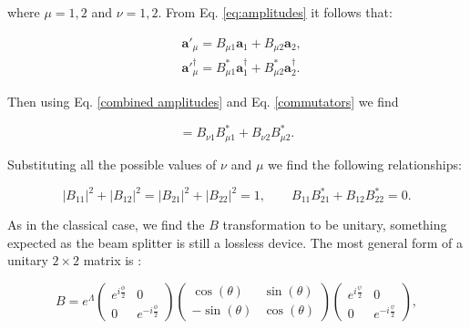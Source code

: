 \documentclass[12pt]{book}
\begin{document}
where $\mu=1,2$ and $\nu=1,2$. From Eq. \ref{eq:amplitudes} it follows that:

\begin{align}
&\mathbf{a}'_{\mu}=B_{\mu 1}\mathbf{a}_{1}+B_{\mu 2} \mathbf{a}_{2}, \\
&\mathbf{a}'^{\dagger}_{\mu}=B_{\mu 1}^{*}\mathbf{a}^{\dagger}_{1}+B_{\mu 2}^{*} \mathbf{a}^{\dagger}_{2}.
\label{combined amplitudes}
\end{align}

Then using Eq. \ref{combined amplitudes} and Eq. \ref{commutators} we find 

\begin{equation}
   [\mathbf{a}'_{\nu},\mathbf{a}'^{\dagger}_{\mu}]=B_{\nu 1} B_{\mu 1}^{*}+B_{\nu 2} B_{\mu 2}^{*} .
\end{equation}

Substituting all the possible values of $\nu$ and $\mu$ we find the following relationships:

\begin{equation}
|B_{11}|^{2}+|B_{12}|^{2}=|B_{21}|^{2}+|B_{22}|^{2}=1 ,\qquad B_{11} B_{21}^{*}+B_{12} B_{22}^{*}=0.
\end{equation}

As in the classical case, we find the $B$ transformation to be unitary, something expected as the beam splitter is still a lossless device. The most general form of a unitary $2\times2$ matrix is \cite{leonhardt}:


\begin{equation}
B=e^{\Lambda} \begin{pmatrix} e^{i\frac{\phi}{2}} & 0 \\ 0 & e^{-i\frac{\phi}{2}} \end{pmatrix} \begin{pmatrix} \cos(\theta) &  \sin(\theta) \\ - \sin(\theta) & \cos(\theta) \end{pmatrix} \begin{pmatrix} e^{i\frac{\psi}{2}} & 0 \\ 0 & e^{-i\frac{\psi}{2}} \end{pmatrix} \label{unitary},
\end{equation}
\end{document}
